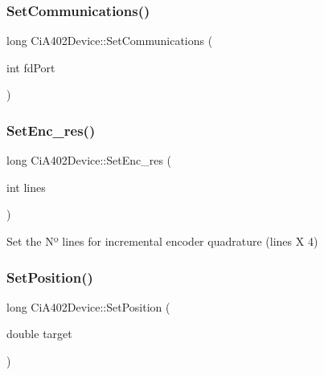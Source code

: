 \mbox{\label{classCiA402Device_abf511a7d44b62ac93ae18fe21f8d51c9}} 
\subsubsection{\texorpdfstring{Set\+Communications()}{SetCommunications()}}
{\footnotesize\ttfamily long Ci\+A402\+Device\+::\+Set\+Communications (\begin{DoxyParamCaption}\item[{int}]{fd\+Port }\end{DoxyParamCaption})}

\mbox{\label{classCiA402Device_a065607adbfdf2446887554b1a3192243}} 
\subsubsection{\texorpdfstring{Set\+Enc\+\_\+res()}{SetEnc\_res()}}
{\footnotesize\ttfamily long Ci\+A402\+Device\+::\+Set\+Enc\+\_\+res (\begin{DoxyParamCaption}\item[{int}]{lines }\end{DoxyParamCaption})}



Set the Nº lines for incremental encoder quadrature (lines X 4) 

\mbox{\label{classCiA402Device_ac13cd5d90f8d39e1ef9734d035e67acb}} 
\subsubsection{\texorpdfstring{Set\+Position()}{SetPosition()}}
{\footnotesize\ttfamily long Ci\+A402\+Device\+::\+Set\+Position (\begin{DoxyParamCaption}\item[{double}]{target }\end{DoxyParamCaption})}




